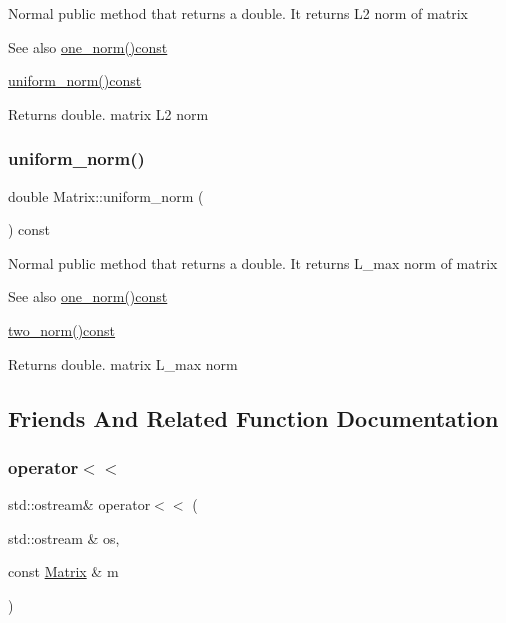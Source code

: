 Normal public method that returns a double. It returns L2 norm of matrix \begin{DoxySeeAlso}{See also}
\hyperlink{class_matrix_af4d468252f3ecbbcaa5726c76e332b4c}{one\+\_\+norm()const} 

\hyperlink{class_matrix_a43066c7fe6418aad40170b85415063e8}{uniform\+\_\+norm()const} 
\end{DoxySeeAlso}
\begin{DoxyReturn}{Returns}
double. matrix L2 norm 
\end{DoxyReturn}
\mbox{\label{class_matrix_a43066c7fe6418aad40170b85415063e8}} 
\subsubsection{\texorpdfstring{uniform\+\_\+norm()}{uniform\_norm()}}
{\footnotesize\ttfamily double Matrix\+::uniform\+\_\+norm (\begin{DoxyParamCaption}{ }\end{DoxyParamCaption}) const}

Normal public method that returns a double. It returns L\+\_\+max norm of matrix \begin{DoxySeeAlso}{See also}
\hyperlink{class_matrix_af4d468252f3ecbbcaa5726c76e332b4c}{one\+\_\+norm()const} 

\hyperlink{class_matrix_aac496af05ec7aa26afc2b9c6d0ab8b66}{two\+\_\+norm()const} 
\end{DoxySeeAlso}
\begin{DoxyReturn}{Returns}
double. matrix L\+\_\+max norm 
\end{DoxyReturn}


\subsection{Friends And Related Function Documentation}
\mbox{\label{class_matrix_a060711074cb5bcaf4e75498bc040c4b7}} 
\subsubsection{\texorpdfstring{operator$<$$<$}{operator<<}\hspace{0.1cm}{\footnotesize\ttfamily [1/2]}}
{\footnotesize\ttfamily std\+::ostream\& operator$<$$<$ (\begin{DoxyParamCaption}\item[{std\+::ostream \&}]{os,  }\item[{const \hyperlink{class_matrix}{Matrix} \&}]{m }\end{DoxyParamCaption})\hspace{0.3cm}{\ttfamily [friend]}}


